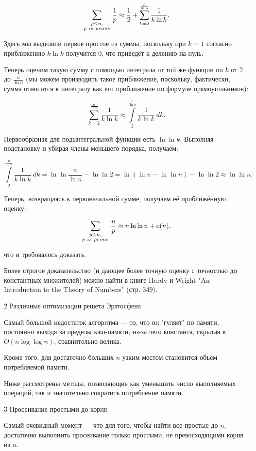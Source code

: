 $$ \sum_{ \scriptstyle p \le n, \atop\scriptstyle p~is~prime } \frac{1}{p} \approx \frac{1}{2} + \sum_{k=2}^{\frac{n}{\ln n}} \frac{1}{k \ln k}. $$

Здесь мы выделили первое простое из суммы, поскольку при $k = 1$ согласно приближению $k \ln k$ получится $0$, что приведёт к делению на нуль.

Теперь оценим такую сумму с помощью интеграла от той же функции по $k$ от $2$ до $\frac{n}{\ln n}$ (мы можем производить такое приближение, поскольку, фактически, сумма относится к интегралу как его приближение по формуле прямоугольников):

$$ \sum_{k=2}^{\frac{n}{\ln n}} \frac{1}{k \ln k} \approx \int\limits_2^{\frac{n}{\ln n}} \frac{1}{k \ln k}\ dk. $$

Первообразная для подынтегральной функции есть $\ln \ln k$. Выполняя подстановку и убирая члены меньшего порядка, получаем:

$$ \int\limits_2^{\frac{n}{\ln n}} \frac{1}{k \ln k}\ dk = \ln \ln \frac{n}{\ln n} - \ln \ln 2 = \ln (\ln n - \ln \ln n) - \ln \ln 2 \approx \ln \ln n. $$

Теперь, возвращаясь к первоначальной сумме, получаем её приближённую оценку:

$$ \sum_{ \scriptstyle p \le n, \atop\scriptstyle p~is~prime } \frac{n}{p} \approx n \ln \ln n + o(n), $$

что и требовалось доказать.

Более строгое доказательство (и дающее более точную оценку с точностью до константных множителей) можно найти в книге Hardy и Wright "An Introduction to the Theory of Numbers" (стр. 349).


\h2{ Различные оптимизации решета Эратосфена }

Самый большой недостаток алгоритма --- то, что он "гуляет" по памяти, постоянно выходя за пределы кэш-памяти, из-за чего константа, скрытая в  $O (n \log \log n)$, сравнительно велика.

Кроме того, для достаточно больших $n$ узким местом становится объём потребляемой памяти.

Ниже рассмотрены методы, позволяющие как уменьшить число выполняемых операций, так и значительно сократить потребление памяти.


\h3{ Просеивание простыми до корня }

Самый очевидный момент --- что для того, чтобы найти все простые до $n$, достаточно выполнить просеивание только простыми, не превосходящими корня из $n$.

